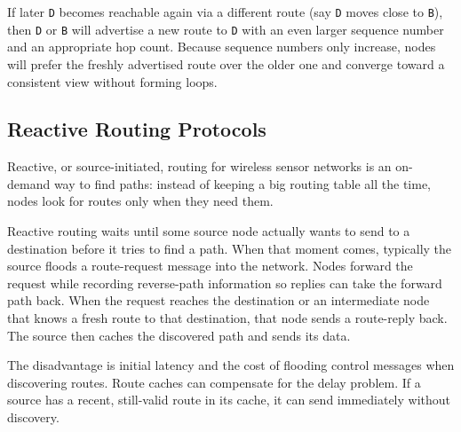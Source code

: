 If later \texttt{D} becomes reachable again via a different route (say \texttt{D} moves close to \texttt{B}), then \texttt{D} or \texttt{B} will advertise a new route to \texttt{D} with an even larger sequence number and an appropriate hop count. Because sequence numbers only increase, nodes will prefer the freshly advertised route over the older one and converge toward a consistent view without forming loops.

\subsection{Reactive Routing Protocols}
Reactive, or source-initiated, routing for wireless sensor networks is an on-demand way to find paths: instead of keeping a big routing table all the time, nodes look for routes only when they need them.

Reactive routing waits until some source node actually wants to send to a destination before it tries to find a path. When that moment comes, typically the source floods a route-request message into the network. Nodes forward the request while recording reverse-path information so replies can take the forward path back. When the request reaches the destination or an intermediate node that knows a fresh route to that destination, that node sends a route-reply back. The source then caches the discovered path and sends its data.

The disadvantage is initial latency and the cost of flooding control messages when discovering routes. Route caches can compensate for the delay problem. If a source has a recent, still-valid route in its cache, it can send immediately without discovery. 


